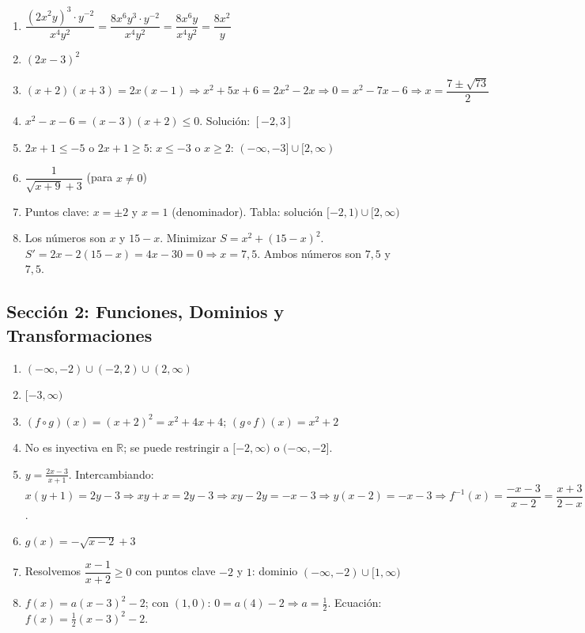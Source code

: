 \documentclass[12pt, letterpaper]{article}
\begin{document}
\begin{enumerate}[series=soluciones, leftmargin=*, label=\textbf{\arabic*.}]
  \item $\dfrac{(2x^2y)^3 \cdot y^{-2}}{x^4 y^2} = \dfrac{8x^6 y^3 \cdot y^{-2}}{x^4 y^2} = \dfrac{8x^6 y}{x^4 y^2} = \dfrac{8x^2}{y}$
  \item $(2x - 3)^2$
  \item $(x + 2)(x + 3) = 2x(x - 1) \Rightarrow x^2 + 5x + 6 = 2x^2 - 2x \Rightarrow 0 = x^2 - 7x - 6 \Rightarrow x = \dfrac{7 \pm \sqrt{73}}{2}$
  \item $x^2 - x - 6 = (x - 3)(x + 2) \leq 0.$ Solución: $[-2, 3]$
  \item $2x + 1 \leq -5$ o $2x + 1 \geq 5$: $x \leq -3$ o $x \geq 2$: $(-\infty, -3] \cup [2, \infty)$
  \item $\dfrac{1}{\sqrt{x + 9} + 3}$ (para $x \neq 0$)
  \item Puntos clave: $x = \pm 2$ y $x = 1$ (denominador). Tabla: solución $[-2, 1) \cup [2, \infty)$
  \item Los números son $x$ y $15 - x$. Minimizar $S = x^2 + (15 - x)^2$. $S' = 2x - 2(15 - x) = 4x - 30 = 0 \Rightarrow x = 7{,}5$. Ambos números son $7{,}5$ y $7{,}5$.
\end{enumerate}

\subsection*{Sección 2: Funciones, Dominios y Transformaciones}

\begin{enumerate}[resume=soluciones, leftmargin=*, label=\textbf{\arabic*.}]
  \item $(-\infty, -2) \cup (-2, 2) \cup (2, \infty)$
  \item $[-3, \infty)$
  \item $(f \circ g)(x) = (x + 2)^2 = x^2 + 4x + 4$; $(g \circ f)(x) = x^2 + 2$
  \item No es inyectiva en $\mathbb{R}$; se puede restringir a $[-2, \infty)$ o $(-\infty, -2]$.
  \item $y = \frac{2x - 3}{x + 1}$. Intercambiando: $x(y + 1) = 2y - 3 \Rightarrow xy + x = 2y - 3 \Rightarrow xy - 2y = -x - 3 \Rightarrow y(x - 2) = -x - 3 \Rightarrow f^{-1}(x) = \dfrac{-x - 3}{x - 2} = \dfrac{x + 3}{2 - x}$.
  \item $g(x) = -\sqrt{x - 2} + 3$
  \item Resolvemos $\dfrac{x - 1}{x + 2} \geq 0$ con puntos clave $-2$ y $1$: dominio $(-\infty, -2) \cup [1, \infty)$
  \item $f(x) = a(x - 3)^2 - 2$; con $(1, 0)$: $0 = a(4) - 2 \Rightarrow a = \frac{1}{2}$. Ecuación: $f(x) = \frac{1}{2}(x - 3)^2 - 2$.
\end{enumerate}
\end{document}
